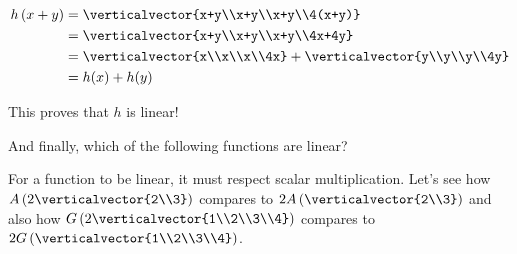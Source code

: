 \documentclass{ximera}
\begin{document}
\begin{question}
\begin{solution}
\begin{hint}
\begin{question}
        	 \begin{align*}
        	 h\left(x+y\right)&= \verticalvector{x+y\\x+y\\x+y\\4(x+y)}\\
        	 &= \verticalvector{x+y\\x+y\\x+y\\4x+4y}\\
        	 &= \verticalvector{x\\x\\x\\4x}+\verticalvector{y\\y\\y\\4y}\\
        	 &=h(x)+h(y)
        	 \end{align*}
		 
        	 This proves that $h$ is linear!
		
        \end{question}
	
    \end{hint}
    \begin{multiple-choice}
    \end{multiple-choice}
  \end{solution}

  And finally, which of the following functions are linear?
  
  \begin{solution}
  
    \begin{hint}
    	For a function to be linear, it must respect scalar multiplication.  Let's see how $A\left( 2\verticalvector{2\\3}\right)$ compares to 
    	$2A\left(\verticalvector{2\\3}\right)$ and also how $G\left(2\verticalvector{1\\2\\3\\4}\right)$ compares to 
    	$2G\left(\verticalvector{1\\2\\3\\4}\right)$.
	

\end{hint}
\end{solution}
\end{question}
\end{document}
